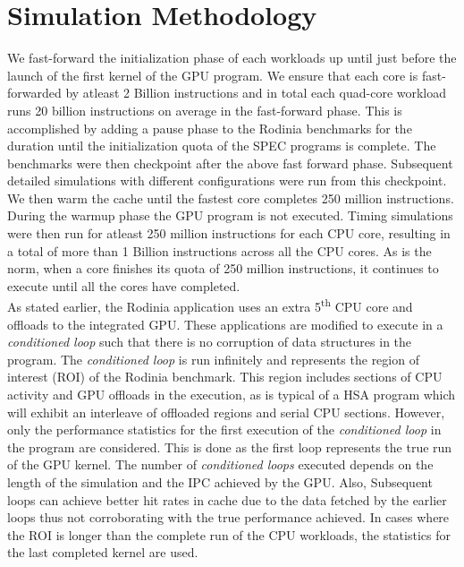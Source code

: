 \section{Simulation Methodology} \label{simulation-methodology}
We fast-forward the initialization phase of each workloads up until just before the launch of the first kernel of the GPU program. We ensure that each core is fast-forwarded by atleast 2 Billion instructions and in total each quad-core workload runs 20 billion instructions on average in the fast-forward phase. This is accomplished by adding a pause phase to the Rodinia benchmarks for the duration until the initialization quota of the SPEC programs is complete. The benchmarks were then checkpoint after the above fast forward phase. Subsequent detailed simulations with different configurations were run from this checkpoint.
We then warm the cache until the fastest core completes 250 million instructions. During the warmup phase the GPU program is not executed. Timing simulations were then run for atleast 250 million instructions for each CPU core, resulting in a total of more than 1 Billion instructions across all the CPU cores. As is the norm, when a core finishes its quota of 250 million instructions, it continues to execute until all the cores have completed. \\
As stated earlier, the Rodinia application uses an extra 5\textsuperscript{th} CPU core and offloads to the integrated GPU. These applications are modified to execute in a \textit{conditioned loop} such that there is no corruption of data structures in the program. The \textit{conditioned loop} is run infinitely and represents the region of interest (ROI) of the Rodinia benchmark. This region includes sections of CPU activity and GPU offloads in the execution, as is typical of a HSA program which will exhibit an interleave of offloaded regions and serial CPU sections. However, only the performance statistics for the first execution of the \textit{conditioned loop} in the program are considered. 
This is done as the first loop represents the true run of the GPU kernel. The number of \textit{conditioned loops} executed depends on the length of the simulation and the IPC achieved by the GPU. Also, Subsequent loops can achieve better hit rates in cache due to the data fetched by the earlier loops thus not corroborating with the true performance achieved.
In cases where the ROI is longer than the complete run of the CPU workloads, the statistics for the last completed kernel are used. 

